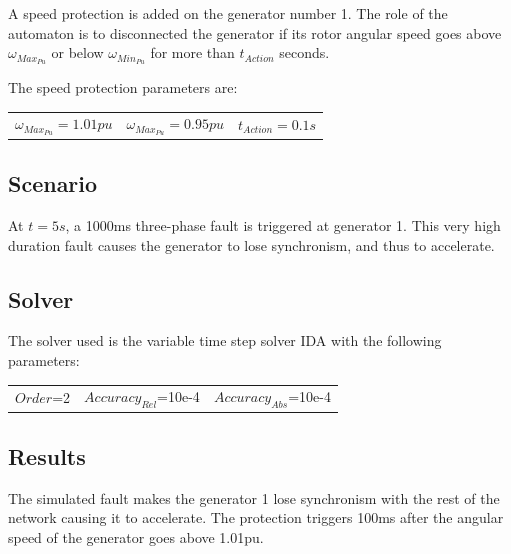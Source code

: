\documentclass[a4paper, 12pt]{report}
\begin{document}
A speed protection is added on the generator number 1. The role of the automaton is to disconnected the generator if its rotor angular speed goes above \(\omega_{Max_{Pu}}\) or below \(\omega_{Min_{Pu}}\) for more than \(t_{Action}\) seconds.

The speed protection parameters are:
\begin{center}
\begin{tabular}{l|l|l}
   $\omega_{Max_{Pu}}=1.01pu$ & $\omega_{Max_{Pu}}=0.95pu$ & $t_{Action}=0.1s$  \\
\end{tabular}
\end{center}

\subsection{Scenario}
At $t=5s$, a 1000ms three-phase fault is triggered at generator 1. This very high duration fault causes the generator to lose synchronism, and thus to accelerate.

\subsection{Solver}
The solver used is the variable time step solver IDA with the following parameters:
\begin{center}
\begin{tabular}{l|l|l}
   $Order$=2 & $Accuracy_{Rel}$=10e-4 & $Accuracy_{Abs}$=10e-4 \\
\end{tabular}
\end{center}

\newpage
\subsection{Results}

The simulated fault makes the generator 1 lose synchronism with the rest of the network causing it to accelerate. The protection triggers 100ms after the angular speed of the generator goes above 1.01pu.
\end{document}
